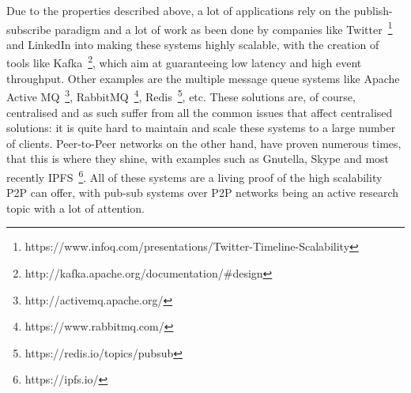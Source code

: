 Due to the properties described above, a lot of applications rely on the
publish-subscribe paradigm and a lot of work as been done by companies
like Twitter~\footnote{https://www.infoq.com/presentations/Twitter-Timeline-Scalability}
and LinkedIn into making these systems highly scalable, with the
creation of tools like Kafka~\footnote{http://kafka.apache.org/documentation/\#design}, which aim at
guaranteeing low latency and high event throughput. Other examples are
the multiple message queue systems like Apache Active MQ~\footnote{http://activemq.apache.org/},
RabbitMQ~\footnote{https://www.rabbitmq.com/}, Redis~\footnote{https://redis.io/topics/pubsub}, etc.
These solutions are, of course, centralised and as such suffer from all the common issues that
affect centralised solutions: it is quite hard to maintain and scale
these systems to a large number of clients. Peer-to-Peer networks on the
other hand, have proven numerous times, that this is where they shine,
with examples such as Gnutella, Skype and most recently IPFS~\footnote{https://ipfs.io/}.
All of these systems are a living proof of the high
scalability P2P can offer, with pub-sub systems over P2P networks being
an active research topic with a lot of attention.
